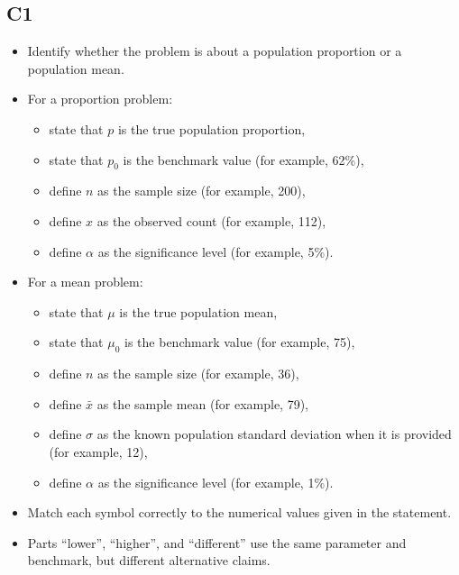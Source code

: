 	\subsection*{C1}
	\begin{itemize}
		\item Identify whether the problem is about a population proportion or a population mean.
		\item For a proportion problem:
		\begin{itemize}
			\item state that \(p\) is the true population proportion,
			\item state that \(p_0\) is the benchmark value (for example, 62\%),
			\item define \(n\) as the sample size (for example, 200),
			\item define \(x\) as the observed count (for example, 112),
			\item define \(\alpha\) as the significance level (for example, 5\%).
		\end{itemize}
		\item For a mean problem:
		\begin{itemize}
			\item state that \(\mu\) is the true population mean,
			\item state that \(\mu_0\) is the benchmark value (for example, 75),
			\item define \(n\) as the sample size (for example, 36),
			\item define \(\bar{x}\) as the sample mean (for example, 79),
			\item define \(\sigma\) as the known population standard deviation when it is provided (for example, 12),
			\item define \(\alpha\) as the significance level (for example, 1\%).
		\end{itemize}
		\item Match each symbol correctly to the numerical values given in the statement.
		\item Parts ``lower'', ``higher'', and ``different'' use the same parameter and benchmark, but different alternative claims.
	\end{itemize}
	
